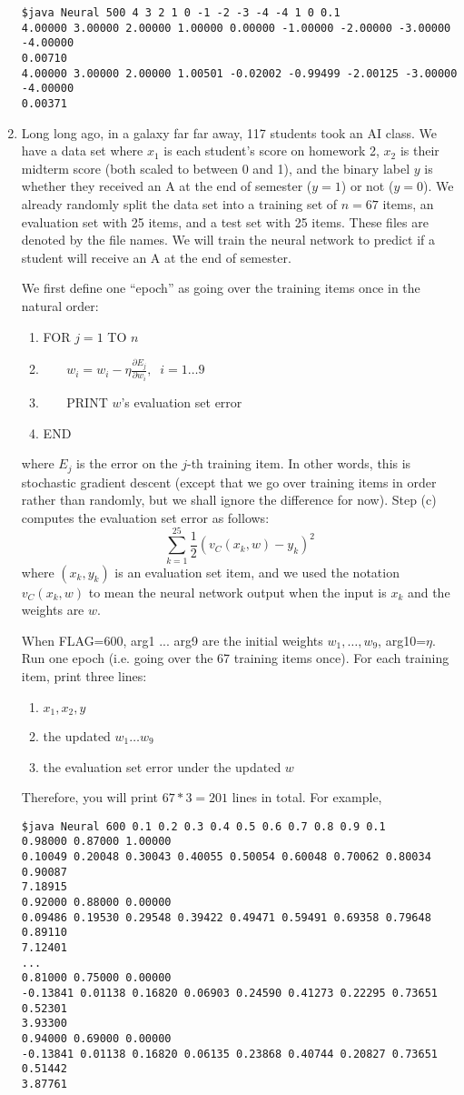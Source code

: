 \documentclass{article}
\begin{document}
\begin{enumerate}
\begin{verbatim}
$java Neural 500 4 3 2 1 0 -1 -2 -3 -4 -4 1 0 0.1
4.00000 3.00000 2.00000 1.00000 0.00000 -1.00000 -2.00000 -3.00000 -4.00000
0.00710
4.00000 3.00000 2.00000 1.00501 -0.02002 -0.99499 -2.00125 -3.00000 -4.00000
0.00371
\end{verbatim}

\item
Long long ago, in a galaxy far far away, 117 students took an AI class.
We have a data set where $x_1$ is each student's score on homework 2, $x_2$ is their midterm score (both scaled to between 0 and 1), and the binary label $y$ is whether they received an A at the end of semester ($y=1$) or not ($y=0$).
We already randomly split the data set into a training set of $n=67$ items, an evaluation set with 25 items, and a test set with 25 items.  These files are denoted by the file names.
We will train the neural network to predict if a student will receive an A at the end of semester.

We first define one ``epoch'' as going over the training items once in the natural order:
\begin{enumerate}
\item FOR $j=1$ TO $n$
\item ~~~ $w_i = w_i - \eta \frac{\partial E_j}{\partial w_i}, \;\; i=1\ldots 9$
\item ~~~ PRINT $w$'s evaluation set error
\item END
\end{enumerate}
where $E_j$ is the error on the $j$-th training item.
In other words, this is stochastic gradient descent (except that we go over training items in order rather than randomly, but we shall ignore the difference for now).
Step (c) computes the evaluation set error as follows:
$$\sum_{k=1}^{25} \frac{1}{2}(v_C(x_k,w) - y_k)^2$$
where $(x_k, y_k)$ is an evaluation set item, and we used the notation $v_C(x_k,w)$ to mean the neural network output when the input is $x_k$ and the weights are $w$.

When FLAG=600, arg1 ... arg9 are the initial weights $w_1, \ldots, w_9$, arg10=$\eta$.
Run one epoch (i.e. going over the 67 training items once).
For each training item, print three lines:
\begin{enumerate}
\item $x_1, x_2, y$
\item the updated $w_1 \ldots w_9$
\item the evaluation set error under the updated $w$
\end{enumerate}
Therefore, you will print $67*3=201$ lines in total.
For example,
\begin{verbatim}
$java Neural 600 0.1 0.2 0.3 0.4 0.5 0.6 0.7 0.8 0.9 0.1
0.98000 0.87000 1.00000
0.10049 0.20048 0.30043 0.40055 0.50054 0.60048 0.70062 0.80034 0.90087
7.18915
0.92000 0.88000 0.00000
0.09486 0.19530 0.29548 0.39422 0.49471 0.59491 0.69358 0.79648 0.89110
7.12401
...
0.81000 0.75000 0.00000
-0.13841 0.01138 0.16820 0.06903 0.24590 0.41273 0.22295 0.73651 0.52301
3.93300
0.94000 0.69000 0.00000
-0.13841 0.01138 0.16820 0.06135 0.23868 0.40744 0.20827 0.73651 0.51442
3.87761
\end{verbatim}


\end{enumerate}
\end{document}
